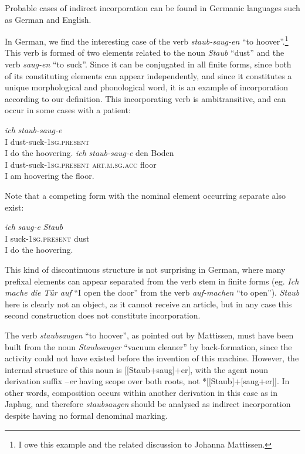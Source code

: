 \documentclass[oldfontcommands,oneside,a4paper,11pt]{article}
\newcommand{\sg}{\textsc{sg}}
\begin{document}
 Probable cases of indirect incorporation can be found in Germanic languages such as German and English.
 
 In German, we find the interesting case of the verb \textit{staub-saug-en} ``to hoover''.\footnote{I owe this example and the related discussion to Johanna Mattissen.} This verb is formed of two elements related to the noun \textit{Staub} ``dust'' and the verb \textit{saug-en} ``to suck''. Since it can be conjugated in all finite forms,  since both of its constituting elements can appear independently, and since  it constitutes a unique morphological and phonological word, it is an example of incorporation according to our definition. This incorporating verb is ambitransitive, and can occur in some cases with a patient:
 
 
   \begin{exe}
\ex
\gll   \textit{ich} \textit{staub-saug-e}     \\
 I dust-suck-1\sg{}.\textsc{present}  \\
 \glt  I do the hoovering.
\ex 
\gll   \textit{ich} \textit{staub-saug-e}  den Boden    \\
 I dust-suck-1\sg{}.\textsc{present} \textsc{art.m.sg.acc} floor \\
 \glt  I am hoovering the floor.
\end{exe}  

Note that a competing form with the nominal element occurring separate also exist:

   \begin{exe}
\ex
\gll   \textit{ich} \textit{saug-e} \textit{Staub }     \\
 I suck-1\sg{}.\textsc{present} dust \\
 \glt  I do the hoovering.
\end{exe}  
This kind of discontinuous structure is not surprising in German, where many prefixal elements can appear separated from the verb stem in finite forms (eg. \textit{Ich mache die Tür auf} ``I open the door'' from the verb \textit{auf-machen} ``to open''). \textit{Staub} here is clearly not an object, as it cannot receive an article, but in any case this second construction does not constitute incorporation.

 The verb \textit{staubsaugen} ``to hoover'', as pointed out by Mattissen, must have been built from the noun \textit{Staubsauger} ``vacuum cleaner'' by back-formation, since the activity could not have existed before the invention of this machine. However, the internal structure of this noun is [[Staub+saug]+er], with the agent noun derivation suffix --\textit{er} having scope over both roots, not *[[Staub]+[saug+er]]. In other words, composition occurs within another derivation in this case as in Japhug, and therefore \textit{staubsaugen} should be analysed as indirect incorporation despite having no formal denominal marking.
 
\end{document}
